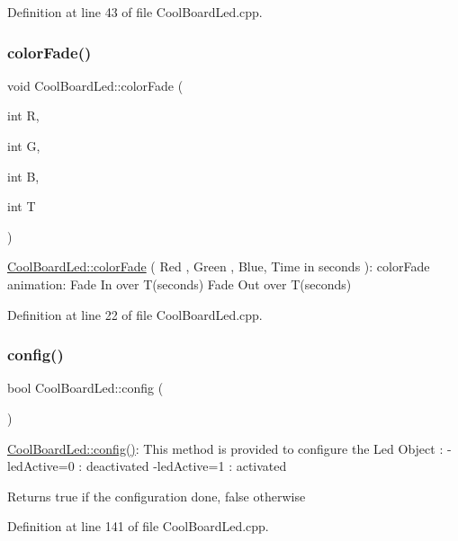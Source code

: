 Definition at line 43 of file Cool\+Board\+Led.\+cpp.

\mbox{\label{class_cool_board_led_a6dbfe23988f43e1242cd05e69b13ff30}} 
\subsubsection{\texorpdfstring{color\+Fade()}{colorFade()}}
{\footnotesize\ttfamily void Cool\+Board\+Led\+::color\+Fade (\begin{DoxyParamCaption}\item[{int}]{R,  }\item[{int}]{G,  }\item[{int}]{B,  }\item[{int}]{T }\end{DoxyParamCaption})}

\hyperlink{class_cool_board_led_a6dbfe23988f43e1242cd05e69b13ff30}{Cool\+Board\+Led\+::color\+Fade} ( Red , Green , Blue, Time in seconds )\+: color\+Fade animation\+: Fade In over T(seconds) Fade Out over T(seconds) 

Definition at line 22 of file Cool\+Board\+Led.\+cpp.

\mbox{\label{class_cool_board_led_a1b60e5e30bea96c49ed62ed1bf1ffc8b}} 
\subsubsection{\texorpdfstring{config()}{config()}}
{\footnotesize\ttfamily bool Cool\+Board\+Led\+::config (\begin{DoxyParamCaption}{ }\end{DoxyParamCaption})}

\hyperlink{class_cool_board_led_a1b60e5e30bea96c49ed62ed1bf1ffc8b}{Cool\+Board\+Led\+::config()}\+: This method is provided to configure the Led Object \+: -\/led\+Active=0 \+: deactivated -\/led\+Active=1 \+: activated \begin{DoxyReturn}{Returns}
true if the configuration done, false otherwise 
\end{DoxyReturn}


Definition at line 141 of file Cool\+Board\+Led.\+cpp.

